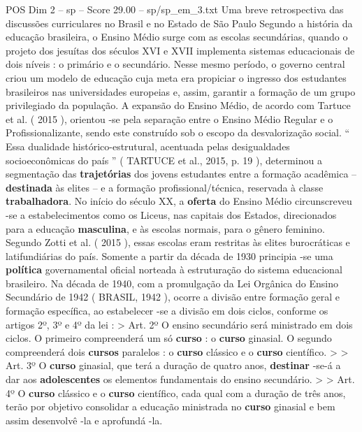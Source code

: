 \begin{textsample}{POS Dim 2 – sp – Score 29.00 – sp/sp\_em\_3.txt}  \label{ex:f2_pos_201}
Uma breve retrospectiva das discussões curriculares no Brasil e no Estado de São Paulo Segundo a história da educação brasileira, o Ensino Médio surge com as escolas secundárias, quando o projeto dos jesuítas dos séculos XVI e XVII implementa sistemas educacionais de dois níveis : o primário e o secundário.
Nesse mesmo período, o governo central criou um modelo de educação cuja meta era propiciar o ingresso dos estudantes brasileiros nas universidades europeias e, assim, garantir a formação de um grupo privilegiado da população.
A expansão do Ensino Médio, de acordo com Tartuce et al. ( 2015 ), orientou -se pela separação entre o Ensino Médio Regular e o Profissionalizante, sendo este construído sob o escopo da desvalorização social. “ Essa dualidade histórico-estrutural, acentuada pelas desigualdades socioeconômicas do país ” ( TARTUCE et al., 2015, p. 19 ), determinou a segmentação das \textbf{trajetórias} dos jovens estudantes entre a formação acadêmica – \textbf{destinada} às elites – e a formação profissional/técnica, reservada à classe \textbf{trabalhadora}.
No início do século XX, a \textbf{oferta} do Ensino Médio circunscreveu -se a estabelecimentos como os Liceus, nas capitais dos Estados, direcionados para a educação \textbf{masculina}, e às escolas normais, para o gênero feminino.
Segundo Zotti et al. ( 2015 ), essas escolas eram restritas às elites burocráticas e latifundiárias do país.
Somente a partir da década de 1930 principia -se uma \textbf{política} governamental oficial norteada à estruturação do sistema educacional brasileiro.
Na década de 1940, com a promulgação da Lei Orgânica do Ensino Secundário de 1942 ( BRASIL, 1942 ), ocorre a divisão entre formação geral e formação específica, ao estabelecer -se a divisão em dois ciclos, conforme os artigos 2º, 3º e 4º da lei : > Art. 2º O ensino secundário será ministrado em dois ciclos.
O primeiro compreenderá um só \textbf{curso} : o \textbf{curso} ginasial.
O segundo compreenderá dois \textbf{cursos} paralelos : o \textbf{curso} clássico e o \textbf{curso} científico. > > Art. 3º O \textbf{curso} ginasial, que terá a duração de quatro anos, \textbf{destinar} -se-á a dar aos \textbf{adolescentes} os elementos fundamentais do ensino secundário. > > Art. 4º O \textbf{curso} clássico e o \textbf{curso} científico, cada qual com a duração de três anos, terão por objetivo consolidar a educação ministrada no \textbf{curso} ginasial e bem assim desenvolvê -la e aprofundá -la.

\end{textsample}

